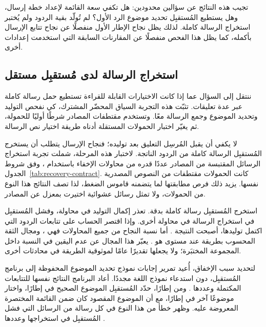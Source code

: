 تجيب هذه النتائج عن سؤالين محدودين: هل تكفي سعة القائمة لإعداد خطة إرسال، وهل يستطيع المُستقبِل تحديد موضوع الرد الأول؟ لم تُولّد بقية الردود ولم يُختبر استخراج الرسالة كاملة. لذلك يظل نجاح الإطار الأول منفصلًا عن نجاح تتابع الإرسال بأكمله، كما يظل هذا الفحص منفصلًا عن المقارنات السابقة التي استخدمت إعدادات أخرى.

\FloatBarrier
\subsection{استخراج الرسالة لدى مُستقبِل مستقل}
\label{sec:october-recovery}

ننتقل إلى السؤال عما إذا كانت الاختيارات القابلة للقراءة تستطيع حمل رسالة كاملة عبر عدة تعليقات. تثبّت هذه التجربة السياق المحضّر المشترك، كي نفحص التوليد وتحديد الموضوع وجمع الرسالة معًا. وتستخدم مقتطفات المصادر شرطًا أوليًا للحمولة، ثم يغيّر اختبار الحمولات المستقلة أدناه طريقة اختيار نص الرسالة.

لا يكفي أن يقبل المُرسِل التعليق بعد توليده؛ فنجاح الإرسال يتطلب أن يستخرج المُستقبِل الرسالة كاملة من الردود الناتجة. لاختبار هذه المرحلة، شملت تجربة استخراج الرسائل المقتبسة من المصادر عددًا قدره \NUM{\OctAttempts} من محاولات الإخفاء باستخدام ، وفق شروط الجدول~\ref{tab:recovery-contract}. كانت الحمولات مقتطفات من النصوص المصدرية نفسها. يزيد ذلك فرص مطابقتها لما يتضمنه قاموس الضغط، لذا تصف النتائج هذا النوع من الحمولات، ولا تمثل رسائل عشوائية اختيرت بمعزل عن المصادر.

استخرج المُستقبِل \NUM{\OctExact/\OctAttempts} رسالة كاملة بدقة. تعذر إكمال التوليد في \NUM{\OctGenerationFailures} محاولة، وفشل المُستقبِل في استخراج الرسالة في \NUM{\OctReceiverFailures} محاولة أخرى. وإذا اقتصر الحساب على تتابعات الردود التي اكتمل توليدها، أصبحت النتيجة \NUM{\OctExact/\OctComplete}. أما نسبة النجاح من جميع المحاولات فهي ، ومجال الثقة المحسوب بطريقة  عند مستوى  هو \NUM{[\OctWilsonLow\%, \OctWilsonHigh\%]}. يعبّر هذا المجال عن عدم اليقين في النسبة داخل المجموعة المختبَرة؛ ولا يجعلها تقديرًا عامًا لموثوقية الطريقة في محادثات أخرى.

لتحديد سبب الإخفاق، أُعيد تمرير إجابات نموذج تحديد الموضوع المحفوظة إلى برنامج المُستقبِل، دون استدعاء نموذج اللغة مجددًا. أعاد البرنامج النتائج نفسها للتتابعات المكتملة وعددها \NUM{\OctComplete}. ومن \NUM{\OctFrames} إطارًا، حدّد المُستقبِل الموضوع الصحيح في \NUM{\OctCorrectFrames} إطارًا، واختار موضوعًا آخر في \NUM{\OctConfusedFrames} إطارًا، مع أن الموضوع المقصود كان ضمن القائمة المختصرة المعروضة عليه. وظهر خطأ من هذا النوع في كل رسالة من الرسائل التي فشل المُستقبِل في استخراجها وعددها \NUM{\OctReceiverFailures}.

